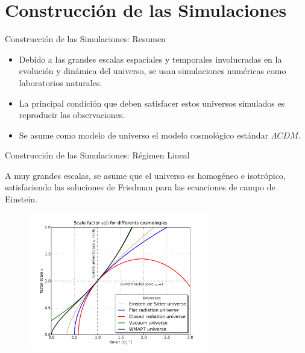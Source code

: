 \documentclass[8pt,fleqn]{beamer}
\begin{document}
\section{Construcción de las Simulaciones}
\label{sec:Simulations}
\begin{frame}
\begin{block}{Construcción de las Simulaciones: Resumen}\justifying

\begin{itemize}
\item Debido a las grandes escalas espaciales y temporales involucradas en la
evolución y dinámica del universo, se usan simulaciones numéricas como
laboratorios naturales.

\item La principal condición que deben satisfacer estos universos simulados 
es reproducir las observaciones.

\item Se asume como modelo de universo el modelo cosmológico estándar 
$\Lambda CDM$.
\end{itemize}

\end{block}
\end{frame}
\begin{frame}
\begin{block}{Construcción de las Simulaciones: Régimen Lineal}\justifying

A muy grandes escalas, se asume que el universo es homogéneo e isotrópico,
satisfaciendo las soluciones de Friedman para las ecuaciones de campo de 
Einstein.

\begin{figure}[htbp]
	\centering
	\includegraphics[trim = 0mm 0mm 0mm 0mm, clip, width=0.7\textwidth]
	{./figures/Friedmann_Solution.pdf}
\end{figure}

\end{block}
\end{frame}
\end{document}
